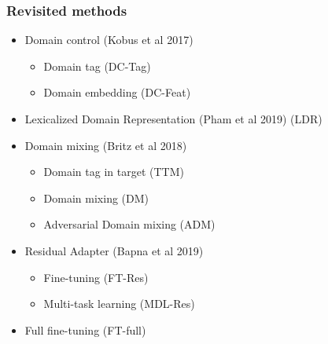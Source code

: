 \documentclass{beamer}
\begin{document}
\begin{frame}
\frametitle{Revisited methods}
\begin{itemize}
	\item Domain control (Kobus et al 2017)
	\begin{itemize}
		\item Domain tag (DC-Tag)
		\item Domain embedding (DC-Feat)
	\end{itemize}
	\item Lexicalized Domain Representation (Pham et al 2019) (LDR)
	\item Domain mixing (Britz et al 2018)
	\begin{itemize}
		\item Domain tag in target (TTM)
		\item Domain mixing (DM)
		\item Adversarial Domain mixing (ADM)
	\end{itemize}
	\item Residual Adapter (Bapna et al 2019)
	\begin{itemize}
		\item Fine-tuning (FT-Res)
		\item Multi-task learning (MDL-Res)
	\end{itemize}
	\item Full fine-tuning (FT-full)
\end{itemize}
\end{frame}
\end{document}
